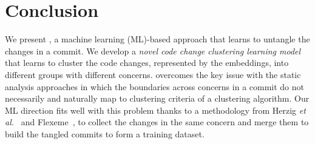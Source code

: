 \section{Conclusion}
\label{conclusion:sec}

We present {\bf \tool}, a machine learning (ML)-based approach that
learns to untangle the changes in a commit. We develop a {\em novel
  code change clustering learning model} that learns to cluster the
code changes, represented by the embeddings, into different groups
with different concerns. {\tool} overcomes the key issue with the
static analysis approaches in which the boundaries across concerns in
a commit do not necessarily and naturally map to clustering criteria
of a clustering algorithm.  Our ML direction fits well with this
problem thanks to a methodology from Herzig {\em et
  al.}~\cite{kim-msr13} and Flexeme~\cite{flexeme-fse20}, to collect
the changes in the same concern and merge them to build the tangled
commits to form a training dataset.
